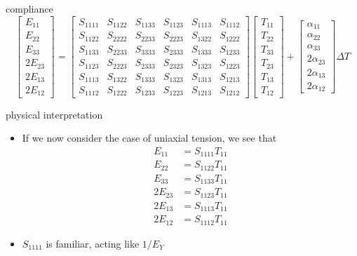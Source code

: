 \documentclass[
  letterpaper,
  ignorenonframetext,
  aspectratio=43,
  handout,
  12pt]{beamer}
\begin{document}
\begin{frame}{compliance}
\protect\hypertarget{compliance}{}
\[\begin{bmatrix}
    E_{11}\\ E_{22} \\ E_{33} \\ 2E_{23} \\ 2E_{13} \\ 2E_{12}
\end{bmatrix}
= \begin{bmatrix}
    S_{1111} & S_{1122} & S_{1133} & S_{1123} & S_{1113} & S_{1112} \\
    S_{1122} & S_{2222} & S_{2233} & S_{2223} & S_{1322} & S_{1222} \\
    S_{1133} & S_{2233} & S_{3333} & S_{2333} & S_{1333} & S_{1233} \\
    S_{1123} & S_{2223} & S_{2333} & S_{2323} & S_{1323} & S_{1223} \\
    S_{1113} & S_{1322} & S_{1333} & S_{1323} & S_{1313} & S_{1213} \\
    S_{1112} & S_{1222} & S_{1233} & S_{1223} & S_{1213} & S_{1212}
\end{bmatrix}\begin{bmatrix}
    T_{11} \\ T_{22} \\ T_{33} \\ T_{23} \\ T_{13} \\ T_{12}
\end{bmatrix} + \begin{bmatrix}
    \alpha_{11} \\ \alpha_{22} \\ \alpha_{33} \\ 2\alpha_{23} \\ 2\alpha_{13} \\ 2\alpha_{12}
\end{bmatrix}\Delta T\]
\end{frame}

\begin{frame}{physical interpretation}
\protect\hypertarget{physical-interpretation-1}{}
\begin{itemize}
\item
  If we now consider the case of uniaxial tension, we see that
  \[\begin{aligned}
    E_{11} &= S_{1111} T_{11}\\
    E_{22} &= S_{1122} T_{11}\\
    E_{33} &= S_{1133} T_{11}\\
    2E_{23} &= S_{1123} T_{11}\\
    2E_{13} &= S_{1113} T_{11}\\
    2E_{12} &= S_{1112} T_{11}
  \end{aligned}\]
\item
  \(S_{1111}\) is familiar, acting like \(1/E_Y\)
\end{itemize}
\end{frame}
\end{document}
